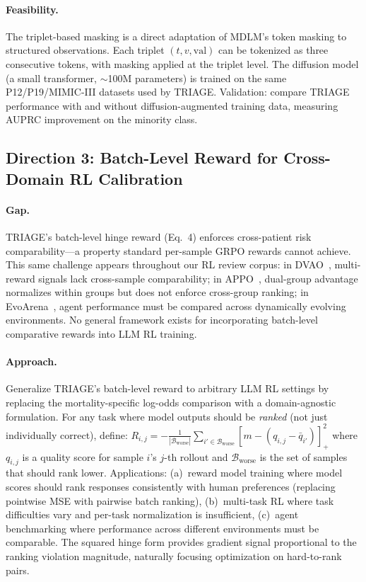 \documentclass[11pt,a4paper]{article}
\begin{document}
\paragraph{Feasibility.} The triplet-based masking is a direct adaptation of MDLM's token masking to structured observations. Each triplet $(t, v, \mathrm{val})$ can be tokenized as three consecutive tokens, with masking applied at the triplet level. The diffusion model (a small transformer, $\sim$100M parameters) is trained on the same P12/P19/MIMIC-III datasets used by TRIAGE. Validation: compare TRIAGE performance with and without diffusion-augmented training data, measuring AUPRC improvement on the minority class.

\subsection{Direction 3: Batch-Level Reward for Cross-Domain RL Calibration}

\paragraph{Gap.} TRIAGE's batch-level hinge reward (Eq.~4) enforces cross-patient risk comparability---a property standard per-sample GRPO rewards cannot achieve. This same challenge appears throughout our RL review corpus: in DVAO~\cite{chen2026dvao}, multi-reward signals lack cross-sample comparability; in APPO~\cite{wang2026appo}, dual-group advantage normalizes within groups but does not enforce cross-group ranking; in EvoArena~\cite{xu2026evoarena}, agent performance must be compared across dynamically evolving environments. No general framework exists for incorporating batch-level comparative rewards into LLM RL training.

\paragraph{Approach.} Generalize TRIAGE's batch-level reward to arbitrary LLM RL settings by replacing the mortality-specific log-odds comparison with a domain-agnostic formulation. For any task where model outputs should be \emph{ranked} (not just individually correct), define: $R_{i,j} = -\frac{1}{|\mathcal{B}_{\mathrm{worse}}|} \sum_{i' \in \mathcal{B}_{\mathrm{worse}}} [m - (q_{i,j} - \bar{q}_{i'})]_+^2$ where $q_{i,j}$ is a quality score for sample $i$'s $j$-th rollout and $\mathcal{B}_{\mathrm{worse}}$ is the set of samples that should rank lower. Applications: (a)~reward model training where model scores should rank responses consistently with human preferences (replacing pointwise MSE with pairwise batch ranking), (b)~multi-task RL where task difficulties vary and per-task normalization is insufficient, (c)~agent benchmarking where performance across different environments must be comparable. The squared hinge form provides gradient signal proportional to the ranking violation magnitude, naturally focusing optimization on hard-to-rank pairs.
\end{document}
